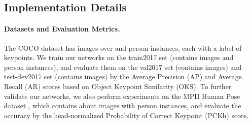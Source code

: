 \documentclass{article}
\begin{document}
\begin{table}[t]
\centering
{}
\caption{Comparisons of results on the MPII val set. \textbf{Bold} indicates the best result and \underline{underline} indicates the second-best result.}
\label{tab4}
\end{table}

\subsection{Implementation Details}
\paragraph{Datasets and Evaluation Metrics.} The COCO dataset \cite{lin:coco} has images over  and  person instances, each with a label of  keypoints. We train our networks on the train2017 set (contains  images and  person instances), and evaluate them on the val2017 set (contains  images) and test-dev2017 set (contains  images) by the Average Precision (AP) and Average Recall (AR) scores based on Object Keypoint Similarity (OKS). To further validate our networks, we also perform experiments on the MPII Human Pose dataset \cite{andriluka:mpii}, which contains about  images with  person instances, and evaluate the accuracy by the head-normalized Probability of Correct Keypoint (PCKh) score.
\end{document}
